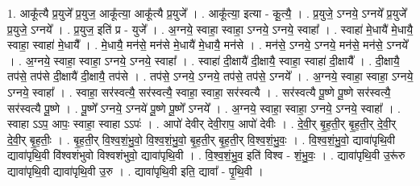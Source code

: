 \documentclass[17pt]{extarticle}
\begin{document}
1. आकू᳚त्यै प्र॒युजे᳚ प्र॒युज॒ आकू᳚त्या॒ आकू᳚त्यै प्र॒युजे᳚ । . आकू᳚त्या॒ इत्या - कू॒त्यै॒ । . प्र॒युजे॒ ऽग्नये॒ ऽग्नये᳚ प्र॒युजे᳚ प्र॒युजे॒ ऽग्नये᳚ । . प्र॒युज॒ इति॑ प्र - युजे᳚ । . अ॒ग्नये॒ स्वाहा॒ स्वाहा॒ ऽग्नये॒ ऽग्नये॒ स्वाहा᳚ । . स्वाहा॑ मे॒धायै॑ मे॒धायै॒ स्वाहा॒ स्वाहा॑ मे॒धायै᳚ । . मे॒धायै॒ मन॑से॒ मन॑से मे॒धायै॑ मे॒धायै॒ मन॑से । . मन॑से॒ ऽग्नये॒ ऽग्नये॒ मन॑से॒ मन॑से॒ ऽग्नये᳚ । . अ॒ग्नये॒ स्वाहा॒ स्वाहा॒ ऽग्नये॒ ऽग्नये॒ स्वाहा᳚ । . स्वाहा॑ दी॒क्षायै॑ दी॒क्षायै॒ स्वाहा॒ स्वाहा॑ दी॒क्षायै᳚ । . दी॒क्षायै॒ तप॑से॒ तप॑से दी॒क्षायै॑ दी॒क्षायै॒ तप॑से । . तप॑से॒ ऽग्नये॒ ऽग्नये॒ तप॑से॒ तप॑से॒ ऽग्नये᳚ । . अ॒ग्नये॒ स्वाहा॒ स्वाहा॒ ऽग्नये॒ ऽग्नये॒ स्वाहा᳚ । . स्वाहा॒ सर॑स्वत्यै॒ सर॑स्वत्यै॒ स्वाहा॒ स्वाहा॒ सर॑स्वत्यै । . सर॑स्वत्यै पू॒ष्णे पू॒ष्णे सर॑स्वत्यै॒ सर॑स्वत्यै पू॒ष्णे । . पू॒ष्णे᳚ ऽग्नये॒ ऽग्नये॑ पू॒ष्णे पू॒ष्णे᳚ ऽग्नये᳚ । . अ॒ग्नये॒ स्वाहा॒ स्वाहा॒ ऽग्नये॒ ऽग्नये॒ स्वाहा᳚ । . स्वाहा ऽऽप॒ आपः॒ स्वाहा॒ स्वाहा ऽऽपः॑ । . आपो॑ देवीर् देवी॒राप॒ आपो॑ देवीः । . दे॒वी॒र् बृ॒ह॒ती॒र् बृ॒ह॒ती॒र् दे॒वी॒र् दे॒वी॒र् बृ॒ह॒तीः॒ । . बृ॒ह॒ती॒र् वि॒श्व॒शं॒भु॒वो॒ वि॒श्व॒शं॒भु॒वो॒ बृ॒ह॒ती॒र् बृ॒ह॒ती॒र् वि॒श्व॒शं॒भु॒वः॒ । . वि॒श्व॒शं॒भु॒वो॒ द्यावा॑पृथि॒वी द्यावा॑पृथि॒वी वि॑श्वशंभुवो विश्वशंभुवो॒ द्यावा॑पृथि॒वी । . वि॒श्व॒शं॒भु॒व॒ इति॑ विश्व - शं॒भु॒वः॒ । . द्यावा॑पृथि॒वी उ॒रू॑रु द्यावा॑पृथि॒वी द्यावा॑पृथि॒वी उ॒रु । . द्यावा॑पृथि॒वी इति॒ द्यावा᳚ - पृ॒थि॒वी । \newline
\end{document}
